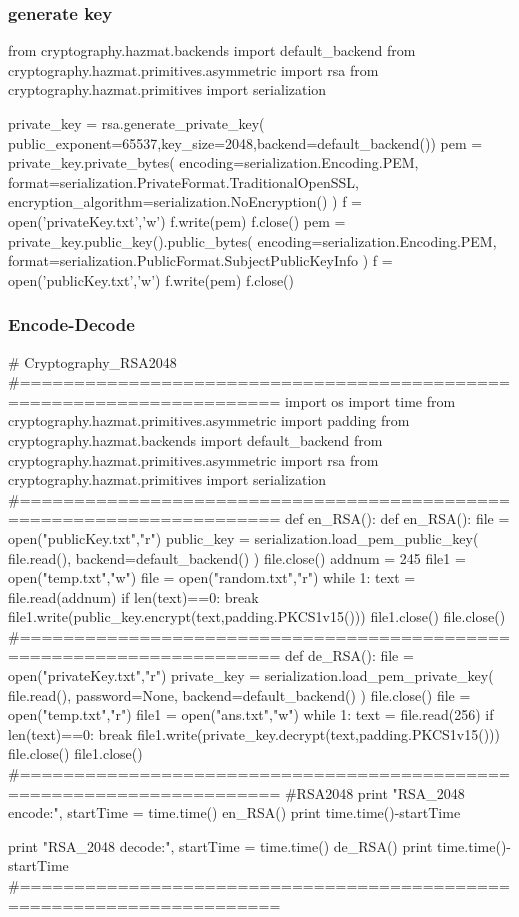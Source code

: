 \documentclass{article}
\begin{document}
\subsubsection{generate key}
\begin{python}
from cryptography.hazmat.backends import default_backend
from cryptography.hazmat.primitives.asymmetric import rsa
from cryptography.hazmat.primitives import serialization

private_key = rsa.generate_private_key(
    public_exponent=65537,key_size=2048,backend=default_backend())
pem = private_key.private_bytes(
    encoding=serialization.Encoding.PEM,
    format=serialization.PrivateFormat.TraditionalOpenSSL,
    encryption_algorithm=serialization.NoEncryption()
)
f = open('privateKey.txt','w')
f.write(pem)
f.close()
pem = private_key.public_key().public_bytes(
    encoding=serialization.Encoding.PEM,
    format=serialization.PublicFormat.SubjectPublicKeyInfo
)
f = open('publicKey.txt','w')
f.write(pem)
f.close()
\end{python}
\subsubsection{Encode-Decode}
\begin{python}
# Cryptography_RSA2048
#======================================================================
import os
import time
from cryptography.hazmat.primitives.asymmetric import padding
from cryptography.hazmat.backends import default_backend
from cryptography.hazmat.primitives.asymmetric import rsa
from cryptography.hazmat.primitives import serialization
#======================================================================
def en_RSA():
    def en_RSA():
    file = open("publicKey.txt","r")
    public_key = serialization.load_pem_public_key(
        file.read(),
        backend=default_backend()
    )
    file.close()
    addnum = 245
    file1 = open("temp.txt","w")
    file = open("random.txt","r")
    while 1:
        text = file.read(addnum)
        if len(text)==0:
            break
        file1.write(public_key.encrypt(text,padding.PKCS1v15()))
    file1.close()
    file.close()
#======================================================================
def de_RSA():
    file = open("privateKey.txt","r")
    private_key = serialization.load_pem_private_key(
        file.read(),
        password=None,
        backend=default_backend()
    )
    file.close()
    file = open("temp.txt","r")
    file1 = open("ans.txt","w")
    while 1:
        text = file.read(256)
        if len(text)==0:
            break
        file1.write(private_key.decrypt(text,padding.PKCS1v15()))
    file.close()
    file1.close()
#======================================================================
#RSA2048
print "RSA_2048    encode:",
startTime = time.time()
en_RSA()
print time.time()-startTime

print "RSA_2048    decode:",
startTime = time.time()
de_RSA()
print time.time()-startTime
#======================================================================
\end{python}
\newpage
\end{document}
